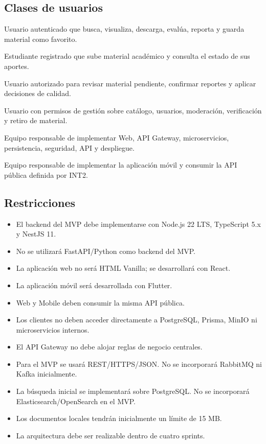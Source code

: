 \documentclass[12pt,a4paper]{article}
\begin{document}
\subsection{Clases de usuarios}

\begin{description}[leftmargin=3.8cm, style=nextline]
    \item[Estudiante registrado] Usuario autenticado que busca, visualiza, descarga, evalúa, reporta y guarda material como favorito.
    \item[Estudiante aportante] Estudiante registrado que sube material académico y consulta el estado de sus aportes.
    \item[Moderador] Usuario autorizado para revisar material pendiente, confirmar reportes y aplicar decisiones de calidad.
    \item[Administrador] Usuario con permisos de gestión sobre catálogo, usuarios, moderación, verificación y retiro de material.
    \item[Equipo INT2] Equipo responsable de implementar Web, API Gateway, microservicios, persistencia, seguridad, API y despliegue.
    \item[Equipo INT4] Equipo responsable de implementar la aplicación móvil y consumir la API pública definida por INT2.
\end{description}

\subsection{Restricciones}

\begin{itemize}
    \item El backend del MVP debe implementarse con Node.js 22 LTS, TypeScript 5.x y NestJS 11.
    \item No se utilizará FastAPI/Python como backend del MVP.
    \item La aplicación web no será HTML Vanilla; se desarrollará con React.
    \item La aplicación móvil será desarrollada con Flutter.
    \item Web y Mobile deben consumir la misma API pública.
    \item Los clientes no deben acceder directamente a PostgreSQL, Prisma, MinIO ni microservicios internos.
    \item El API Gateway no debe alojar reglas de negocio centrales.
    \item Para el MVP se usará REST/HTTPS/JSON. No se incorporará RabbitMQ ni Kafka inicialmente.
    \item La búsqueda inicial se implementará sobre PostgreSQL. No se incorporará Elasticsearch/OpenSearch en el MVP.
    \item Los documentos locales tendrán inicialmente un límite de 15 MB.
    \item La arquitectura debe ser realizable dentro de cuatro sprints.
\end{itemize}
\end{document}
